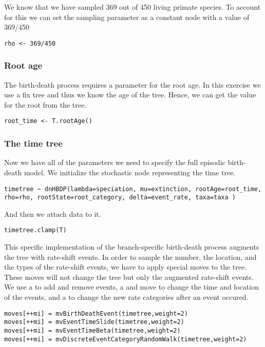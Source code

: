 We know that we have sampled 369 out of 450 living primate species. 
To account for this we can set the sampling parameter as a constant node with a value of 369/450
{\tt \begin{snugshade*}
\begin{lstlisting}
rho <- 369/450
\end{lstlisting}
\end{snugshade*}}


\subsubsection{Root age}

The birth-death process requires a parameter for the root age.
In this exercise we use a fix tree and thus we know the age of the tree.
Hence, we can get the value for the root from the \citet{Springer2012} tree.
{\tt \begin{snugshade*}
\begin{lstlisting}
root_time <- T.rootAge()
\end{lstlisting}
\end{snugshade*}}

\subsubsection{The time tree}

Now we have all of the parameters we need to specify the full episodic birth-death model. 
We initialize the stochastic node representing the time tree.
{\tt \begin{snugshade*}
\begin{lstlisting}
timetree ~ dnHBDP(lambda=speciation, mu=extinction, rootAge=root_time, rho=rho, rootState=root_category, delta=event_rate, taxa=taxa )
\end{lstlisting}
\end{snugshade*}}
And then we attach data to it.
{\tt \begin{snugshade*}
\begin{lstlisting}
timetree.clamp(T)
\end{lstlisting}
\end{snugshade*}}

This specific implementation of the branch-specific birth-death process augments the tree with rate-shift events.
In order to sample the number, the location, and the types of the rate-shift events, we have to apply special moves to the tree.
These moves will not change the tree but only the augmented rate-shift events.
We use a  to add and remove events, a  and  move to change the time and location of the events, 
and a  to change the new rate categories after an event occured.
{\tt \begin{snugshade*}
\begin{lstlisting}
moves[++mi] = mvBirthDeathEvent(timetree,weight=2)
moves[++mi] = mvEventTimeSlide(timetree,weight=2)
moves[++mi] = mvEventTimeBeta(timetree,weight=2)
moves[++mi] = mvDiscreteEventCategoryRandomWalk(timetree,weight=2)
\end{lstlisting}
\end{snugshade*}}

